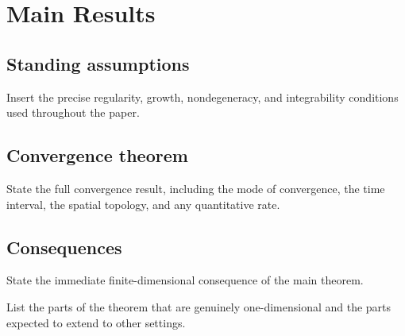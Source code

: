 \section{Main Results}

\subsection{Standing assumptions}

\begin{assumption}
Insert the precise regularity, growth, nondegeneracy, and integrability
conditions used throughout the paper.
\end{assumption}

\subsection{Convergence theorem}

\begin{theorem}
State the full convergence result, including the mode of convergence, the
time interval, the spatial topology, and any quantitative rate.
\end{theorem}

\subsection{Consequences}

\begin{corollary}
State the immediate finite-dimensional consequence of the main theorem.
\end{corollary}

\begin{remark}
List the parts of the theorem that are genuinely one-dimensional and the
parts expected to extend to other settings.
\end{remark}
